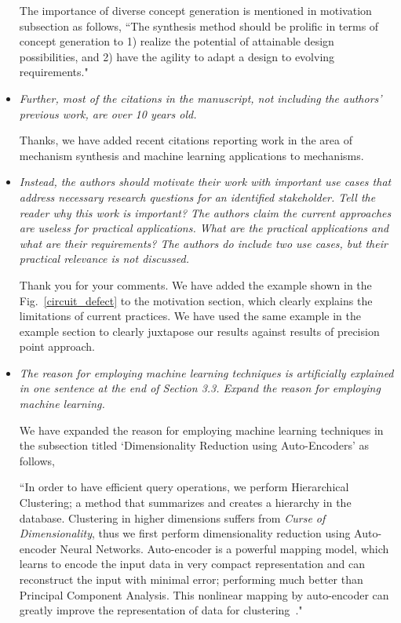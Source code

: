 \documentclass{article}
\begin{document}
\begin{itemize}
The importance of diverse concept generation is mentioned in motivation subsection as follows,
``The synthesis method should be prolific in terms of concept generation to 1) realize the potential of attainable design possibilities, and 2) have the agility to adapt a design to evolving requirements."
\\

  \item \emph{
Further, most of the citations in the manuscript, not including the authors' previous work, are over 10 years old.
}

Thanks, we have added recent citations reporting work in the area of mechanism synthesis and machine learning applications to mechanisms.
\\

  \item \emph{
Instead, the authors should motivate their work with important use cases that address necessary research questions for an identified stakeholder. Tell the reader why this work is important? The authors claim the current approaches are useless for practical applications. What are the practical applications and what are their requirements? The authors do include two use cases, but their practical relevance is not discussed.
}

Thank you for your comments.
We have added the example shown in the Fig.~\ref{circuit_defect} to the motivation section, which clearly explains the limitations of current practices.
We have used the same example in the example section to clearly juxtapose our results against results of precision point approach.
\\

  \item \emph{
 The reason for employing machine learning techniques is artificially explained in one sentence at the end of Section 3.3. Expand the reason for employing machine learning.
}

We have expanded the reason for employing machine learning techniques in the subsection titled `Dimensionality Reduction using Auto-Encoders' as follows,

``In order to have efficient query operations, we perform Hierarchical Clustering; a method that summarizes and creates a hierarchy in the database.
Clustering in higher dimensions suffers from \emph{Curse of Dimensionality}\cite{marimont1979}, thus we first perform dimensionality reduction using Auto-encoder Neural Networks.
Auto-encoder is a powerful mapping model, which learns to encode the input data in very compact representation and can reconstruct the input with minimal error; performing much better than Principal Component Analysis\cite{hinton2006}.
This nonlinear mapping by auto-encoder can greatly improve the representation of data for clustering~\cite{song2013}."


\end{itemize}
\end{document}
